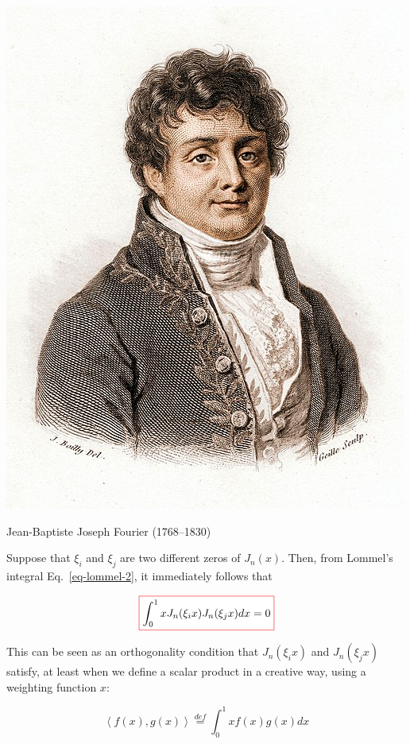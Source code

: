 \begin{marginfigure}[-.3cm]
  \includegraphics{bessel/figures/j_fourier}
  \caption{Jean-Baptiste Joseph Fourier (1768–1830)}
\end{marginfigure}

Suppose that $\xi_i$ and $\xi_j$ are two different zeros of $J_n(x)$. Then, from Lommel's integral Eq.~\ref{eq-lommel-2}, it immediately follows that

\begin{equation}
\fbox{$\displaystyle
\int_0^1 x J_n(\xi_i x)J_n(\xi_j x)dx = 0 \label{eq-bessel-ortho}
$}
\end{equation} 

This can be seen as an orthogonality condition that $J_n(\xi_i x)$ and $J_n(\xi_j x)$ satisfy, at least when we define a scalar product in a creative way, using a weighting function $x$:

\begin{equation}
\left<f(x),g(x)\right> \stackrel{def}{=} \int_0^1 x f(x) g(x) dx
\end{equation} 

